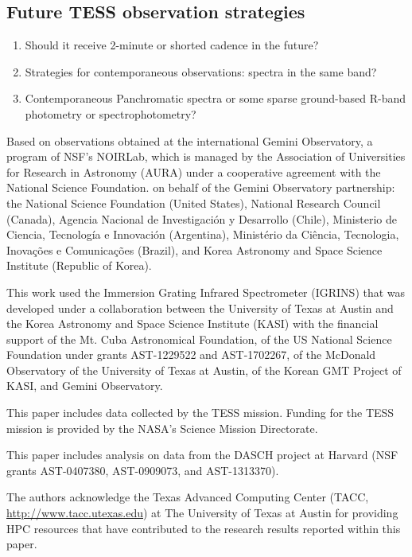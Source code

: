 \documentclass[modern]{aastex631}
\begin{document}
\subsection{Future TESS observation strategies}
\begin{enumerate}
  \item Should it receive 2-minute or shorted cadence in the future? 
  \item Strategies for contemporaneous observations: spectra in the same band?  
  \item Contemporaneous Panchromatic spectra or some sparse ground-based R-band photometry or spectrophotometry?
\end{enumerate}


\begin{acknowledgements}
Based on observations obtained at the international Gemini Observatory, a program of NSF’s NOIRLab, which is managed by the Association of Universities for Research in Astronomy (AURA) under a cooperative agreement with the National Science Foundation. on behalf of the Gemini Observatory partnership: the National Science Foundation (United States), National Research Council (Canada), Agencia Nacional de Investigaci\'{o}n y Desarrollo (Chile), Ministerio de Ciencia, Tecnolog\'{i}a e Innovaci\'{o}n (Argentina), Minist\'{e}rio da Ci\^{e}ncia, Tecnologia, Inova\c{c}\~{o}es e Comunica\c{c}\~{o}es (Brazil), and Korea Astronomy and Space Science Institute (Republic of Korea).

This work used the Immersion Grating Infrared Spectrometer (IGRINS) that was developed under a collaboration between the University of Texas at Austin and the Korea Astronomy and Space Science Institute (KASI) with the financial support of the Mt. Cuba Astronomical Foundation, of the US National Science Foundation under grants AST-1229522 and AST-1702267, of the McDonald Observatory of the University of Texas at Austin, of the Korean GMT Project of KASI, and Gemini Observatory.

This paper includes data collected by the TESS mission. Funding for the TESS mission is provided by the NASA's Science Mission Directorate.

This paper includes analysis on data from the DASCH project at Harvard (NSF grants AST-0407380, AST-0909073, and AST-1313370).

The authors acknowledge the Texas Advanced Computing Center (TACC, \url{http://www.tacc.utexas.edu}) at The University of Texas at Austin for providing HPC resources that have contributed to the research results reported within this paper.
\end{acknowledgements}
\end{document}
